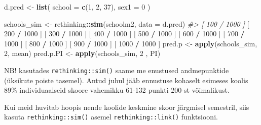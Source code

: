 \documentclass[]{book}
\newenvironment{Shaded}{\begin{snugshade}}{\end{snugshade}}
\newcommand{\CommentTok}[1]{\textcolor[rgb]{0.56,0.35,0.01}{\textit{#1}}}
\newcommand{\DataTypeTok}[1]{\textcolor[rgb]{0.13,0.29,0.53}{#1}}
\newcommand{\DecValTok}[1]{\textcolor[rgb]{0.00,0.00,0.81}{#1}}
\newcommand{\KeywordTok}[1]{\textcolor[rgb]{0.13,0.29,0.53}{\textbf{#1}}}
\newcommand{\NormalTok}[1]{#1}
\newcommand{\OperatorTok}[1]{\textcolor[rgb]{0.81,0.36,0.00}{\textbf{#1}}}
\newcommand{\StringTok}[1]{\textcolor[rgb]{0.31,0.60,0.02}{#1}}
\begin{document}
\begin{Shaded}
\begin{Highlighting}[]
\NormalTok{d.pred <-}\StringTok{ }\KeywordTok{list}\NormalTok{(}
  \DataTypeTok{school =} \KeywordTok{c}\NormalTok{(}\DecValTok{1}\NormalTok{, }\DecValTok{2}\NormalTok{, }\DecValTok{37}\NormalTok{),}
  \DataTypeTok{sex1 =} \DecValTok{0}
\NormalTok{)}

\NormalTok{schools_sim <-}\StringTok{ }\NormalTok{rethinking}\OperatorTok{::}\KeywordTok{sim}\NormalTok{(schoolm2, }\DataTypeTok{data =}\NormalTok{ d.pred) }
\CommentTok{#> [ 100 / 1000 ]}
\NormalTok{[ }\DecValTok{200} \OperatorTok{/}\StringTok{ }\DecValTok{1000}\NormalTok{ ]}
\NormalTok{[ }\DecValTok{300} \OperatorTok{/}\StringTok{ }\DecValTok{1000}\NormalTok{ ]}
\NormalTok{[ }\DecValTok{400} \OperatorTok{/}\StringTok{ }\DecValTok{1000}\NormalTok{ ]}
\NormalTok{[ }\DecValTok{500} \OperatorTok{/}\StringTok{ }\DecValTok{1000}\NormalTok{ ]}
\NormalTok{[ }\DecValTok{600} \OperatorTok{/}\StringTok{ }\DecValTok{1000}\NormalTok{ ]}
\NormalTok{[ }\DecValTok{700} \OperatorTok{/}\StringTok{ }\DecValTok{1000}\NormalTok{ ]}
\NormalTok{[ }\DecValTok{800} \OperatorTok{/}\StringTok{ }\DecValTok{1000}\NormalTok{ ]}
\NormalTok{[ }\DecValTok{900} \OperatorTok{/}\StringTok{ }\DecValTok{1000}\NormalTok{ ]}
\NormalTok{[ }\DecValTok{1000} \OperatorTok{/}\StringTok{ }\DecValTok{1000}\NormalTok{ ]}
\NormalTok{pred.p <-}\StringTok{ }\KeywordTok{apply}\NormalTok{(schools_sim, }\DecValTok{2}\NormalTok{, mean)}
\NormalTok{pred.p.PI <-}\StringTok{ }\KeywordTok{apply}\NormalTok{(schools_sim, }\DecValTok{2}\NormalTok{ , PI)}
\end{Highlighting}
\end{Shaded}

NB! kasutades \texttt{rethinking::sim()} saame me enustused andmepunktide (üksikute poiste tasemel).
Antud juhul jääb ennustuse kohaselt esimeses koolis 89\% individuaalseid skoore vahemikku 61-132 punkti 200-st võimalikust.

Kui meid huvitab hoopis nende koolide keskmine skoor järgmisel semestril, siis kasuta \texttt{rethinking::sim()} asemel \texttt{rethinking::link()} funktsiooni.
\end{document}
